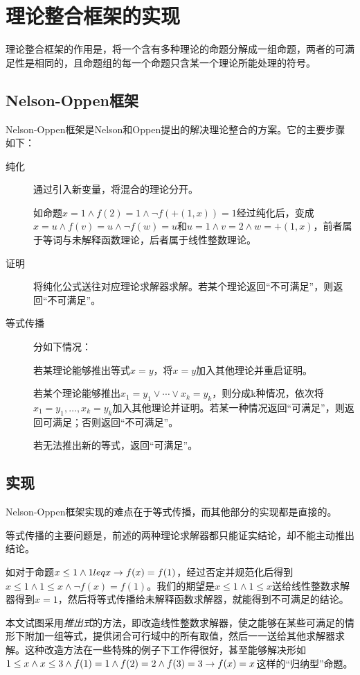\chapter{理论整合框架的实现}
\label{chap:no}

理论整合框架的作用是，将一个含有多种理论的命题分解成一组命题，两者的可满足性是相同的，且命题组的每一个命题只含某一个理论所能处理的符号。

\section{Nelson-Oppen框架}
Nelson-Oppen框架\cite{Nelson:1979:SCD:357073.357079}是Nelson和Oppen提出的解决理论整合的方案。它的主要步骤如下：
\begin{description}
  \item[纯化] 通过引入新变量，将混合的理论分开。

    如命题$x = 1 \land f(2) = 1 \land \lnot f(+(1,x))=1$经过纯化后，变成$x = u \land f(v) = u \land \lnot f(w)=u$和$u = 1 \land v = 2 \land w = +(1, x)$，前者属于等词与未解释函数理论，后者属于线性整数理论。
  \item[证明] 将纯化公式送往对应理论求解器求解。若某个理论返回``不可满足''，则返回``不可满足''。
  \item[等式传播] 分如下情况：

    若某理论能够推出等式$x = y$，将$x = y$加入其他理论并重启证明。

    若某个理论能够推出$x_1 = y_1 \lor \cdots \lor x_k = y_k$，则分成k种情况，依次将$x_1 = y_1, \dots, x_k = y_k$加入其他理论并证明。若某一种情况返回``可满足''，则返回可满足；否则返回``不可满足''。

    若无法推出新的等式，返回``可满足''。
\end{description}

\section{实现}
Nelson-Oppen框架实现的难点在于等式传播，而其他部分的实现都是直接的。

等式传播的主要问题是，前述的两种理论求解器都只能证实结论，却不能主动推出结论。

如对于命题$x \leq 1 \land 1 leq x \rightarrow f(x) = f(1)$，经过否定并规范化后得到$x \leq 1 \land 1 \leq x \land \lnot f(x) = f(1)$。我们的期望是$x \leq 1 \land 1 \leq x$送给线性整数求解器得到$x=1$，然后将等式传播给未解释函数求解器，就能得到不可满足的结论。

本文试图采用\emph{推出式}的方法，即改造线性整数求解器，使之能够在某些可满足的情形下附加一组等式，提供闭合可行域中的所有取值，然后一一送给其他求解器求解。这种改造方法在一些特殊的例子下工作得很好，甚至能够解决形如$1 \leq x \land x \leq 3 \land f(1)=1 \land f(2)=2 \land f(3)=3 \rightarrow f(x)=x$这样的``归纳型''命题。

